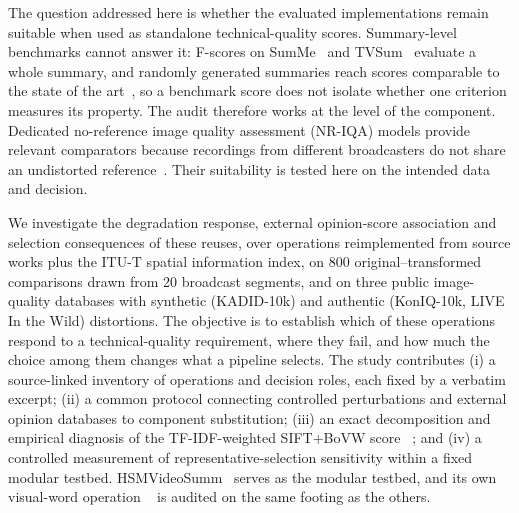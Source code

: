 The question addressed here is whether the evaluated implementations remain suitable when used as standalone technical-quality scores. Summary-level benchmarks cannot answer it: F-scores on SumMe~\citep{gygli2014summe} and TVSum~\citep{song2015tvsum} evaluate a whole summary, and randomly generated summaries reach scores comparable to the state of the art~\citep{otani2019rethinking}, so a benchmark score does not isolate whether one criterion measures its property. The audit therefore works at the level of the component.  Dedicated no-reference image quality assessment (NR-IQA) models provide relevant comparators because recordings from different broadcasters do not share an undistorted reference~\citep{agnolucci2024qualiclip,ke2021musiq,mittal2012brisque,mittal2013niqe,zhang2023liqe}. Their suitability is tested here on the intended data and decision.

We investigate the degradation response, external opinion-score association and selection
consequences of these reuses, over \fontesDaLiteratura{} operations reimplemented from
\fontesTrabalhos{} source works plus the ITU-T spatial information index, on 800
original--transformed comparisons drawn from 20 broadcast segments, and on three public image-quality databases with synthetic (KADID-10k) and authentic (KonIQ-10k, LIVE In the Wild) distortions. The objective is to establish which of these operations respond to a technical-quality requirement, where they fail, and how much the choice among them changes what a pipeline selects. The study contributes (i) a source-linked inventory of operations and decision roles, each fixed by a verbatim excerpt; (ii) a common protocol connecting controlled perturbations and external opinion databases to component substitution; (iii) an exact decomposition and empirical diagnosis of the TF-IDF-weighted SIFT+BoVW score ~\citep{barbieri2021tese}; and (iv) a controlled measurement of representative-selection sensitivity within a fixed modular testbed. HSMVideoSumm~\citep{moraes2024hsmvideosumm} serves as the modular testbed, and its own visual-word operation ~\citep{barbieri2021tese} is audited on the same footing as the others. 
